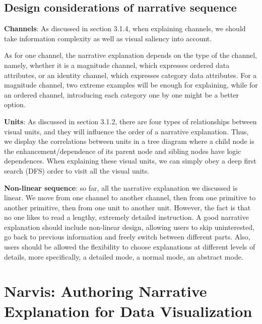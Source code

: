 \documentclass[review,journal]{vgtc}         %
\begin{document}
\subsection{Design considerations of narrative sequence}
\textbf{Channels}: As discussed in section 3.1.4, when explaining channels, we should take information complexity as well as visual saliency into account. \par
As for one channel, the narrative explanation depends on the type of the channel, namely, whether it is a magnitude channel, which expresses ordered data attributes, or an identity channel, which expresses category data attributes. For a magnitude channel, two extreme examples will be enough for explaining, while for an ordered channel, introducing each category one by one might be a better option.\par
\textbf{Units}: As discussed in section 3.1.2, there are four types of relationships between visual units, and they will influence the order of a narrative explanation. Thus, we display the correlations between units in a tree diagram where a child node is the enhancement/dependence of its parent node and sibling nodes have logic dependences. When explaining these visual units, we can simply obey a deep first search (DFS) order to visit all the visual units.\par
\textbf{Non-linear sequence}: so far, all the narrative explanation we discussed is linear. We move from one channel to another channel, then from one primitive to another primitive, then from one unit to another unit. However, the fact is that no one likes to read a lengthy, extremely detailed instruction. A good narrative explanation should include non-linear design, allowing users to skip uninterested, go back to previous information and freely switch between different parts. Also, users should be allowed the flexibility to choose explanations at different levels of details, more specifically, a detailed mode, a normal mode, an abstract mode. \par
\section{Narvis: Authoring Narrative Explanation for Data Visualization}
\end{document}
